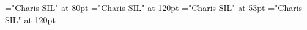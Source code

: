 \documentclass[a4paper]{article}
\begin{document}
\pagestyle{plain}
\sloppy
\setlength{\parfillskip}{0pt plus 1fil}
\font\pa="Charis SIL" at 80pt
\font\childapa="Charis SIL" at 120pt
\font\childbpa="Charis SIL" at 53pt
\font\childaenpa="Charis SIL" at 120pt

\mbox{} 
\newpage 
\newpage 
\setcounter{page}{1} 
\pagestyle{fancy} 


\end{document}
